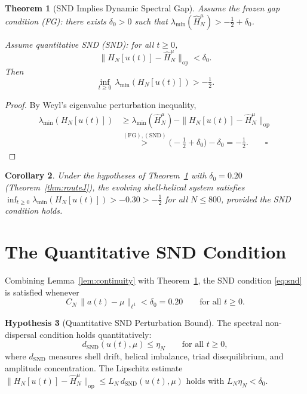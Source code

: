 \documentclass[12pt]{amsart}
\newtheorem{theorem}{Theorem}[section]
\newtheorem{corollary}[theorem]{Corollary}
\theoremstyle{definition}
\newtheorem{hypothesis}[theorem]{Hypothesis}
\newcommand{\HN}{\widehat{H}_N^\mu}
\newcommand{\lmin}{\lambda_{\min}}
\newcommand{\dSND}{d_{\mathrm{SND}}}
\begin{document}
\begin{tcolorbox}[provedbox]
\begin{theorem}[SND Implies Dynamic Spectral Gap]
\label{thm:snd-master}
Assume the frozen gap condition \textup{(FG)}: there exists $\delta_0>0$
such that $\lmin(\HN)>-\tfrac{1}{2}+\delta_0$.

Assume quantitative SND \textup{(SND)}: for all $t\ge0$,
\[
\|H_N[u(t)]-\HN\|_{\mathrm{op}} < \delta_0.
\]
Then
\[
\inf_{t\ge0}\,\lmin(H_N[u(t)]) > -\tfrac{1}{2}.
\]
\end{theorem}

\begin{proof}
By Weyl's eigenvalue perturbation inequality,
\begin{align*}
\lmin(H_N[u(t)])
&\ge \lmin(\HN) - \|H_N[u(t)]-\HN\|_{\mathrm{op}} \\
&\overset{\mathrm{(FG),(SND)}}{>}
  \bigl(-\tfrac{1}{2}+\delta_0\bigr) - \delta_0
  = -\tfrac{1}{2}.\qquad\square
\end{align*}
\end{proof}
\end{tcolorbox}

\begin{corollary}
Under the hypotheses of Theorem~\ref{thm:snd-master} with
$\delta_0=0.20$ (Theorem~\ref{thm:routeJ}), the evolving
shell-helical system satisfies
$\inf_{t\ge0}\lmin(H_N[u(t)])>-0.30>-\tfrac{1}{2}$
for all $N\le 800$, provided the SND condition holds.
\end{corollary}

\section{The Quantitative SND Condition}
\label{sec:snd}

Combining Lemma~\ref{lem:continuity} with Theorem~\ref{thm:snd-master},
the SND condition \eqref{eq:snd} is satisfied whenever
\begin{equation}
\label{eq:product}
C_N\,\|a(t)-\mu\|_{\ell^1} < \delta_0 = 0.20
\qquad\text{for all }t\ge0.
\end{equation}

\begin{hypothesis}[Quantitative SND Perturbation Bound]
\label{hyp:snd}
The spectral non-dispersal condition holds quantitatively:
\[
\dSND(u(t),\mu) \le \eta_N \qquad\text{for all }t\ge0,
\]
where $\dSND$ measures shell drift, helical imbalance,
triad disequilibrium, and amplitude concentration.
The Lipschitz estimate
$\|H_N[u(t)]-\HN\|_{\mathrm{op}}\le L_N\,\dSND(u(t),\mu)$
holds with $L_N\eta_N<\delta_0$.
\end{hypothesis}
\end{document}
